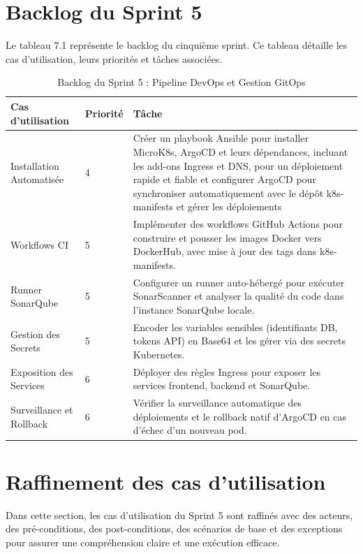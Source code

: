 \section{Backlog du Sprint 5}
Le tableau 7.1 représente le backlog du cinquième sprint. Ce tableau détaille les cas d’utilisation, leurs priorités et tâches associées.
\newpage
\begin{table}[!ht]
      \begin{adjustwidth}{-3.5cm}{-3.5cm}
      \vspace{-1cm}
      \centering
      \caption{Backlog du Sprint 5 : Pipeline DevOps et Gestion GitOps}
      \begin{tabular}{|p{5cm}|p{2cm}|p{8cm}|}
      \hline
      \cellcolor[rgb]{0.832,0.832,0.832}Cas d’utilisation & \cellcolor[rgb]{0.832,0.832,0.832}Priorité & \cellcolor[rgb]{0.832,0.832,0.832}Tâche \\
      \hline
      Installation Automatisée & 4 & Créer un playbook Ansible pour installer MicroK8s, ArgoCD et leurs dépendances, incluant les add-ons Ingress et DNS, pour un déploiement rapide et fiable et configurer ArgoCD pour synchroniser automatiquement avec le dépôt k8s-manifests et gérer les déploiements \\
      \hline
      Workflows CI & 5 & Implémenter des workflows GitHub Actions pour construire et pousser les images Docker vers DockerHub, avec mise à jour des tags dans k8s-manifests. \\
      \hline
      Runner SonarQube & 5 & Configurer un runner auto-hébergé pour exécuter SonarScanner et analyser la qualité du code dans l’instance SonarQube locale. \\
      \hline
      Gestion des Secrets & 5 & Encoder les variables sensibles (identifiants DB, tokens API) en Base64 et les gérer via des secrets Kubernetes. \\
      \hline
      Exposition des Services & 6 & Déployer des règles Ingress pour exposer les services frontend, backend et SonarQube. \\
      \hline
      Surveillance et Rollback & 6 & Vérifier la surveillance automatique des déploiements et le rollback natif d’ArgoCD en cas d’échec d’un nouveau pod. \\
      \hline
      \end{tabular}
      \end{adjustwidth}
\end{table}

\section{Raffinement des cas d’utilisation}
Dans cette section, les cas d'utilisation du Sprint 5 sont raffinés avec des acteurs, des pré-conditions, des post-conditions, des scénarios de base et des exceptions pour assurer une compréhension claire et une exécution efficace.

